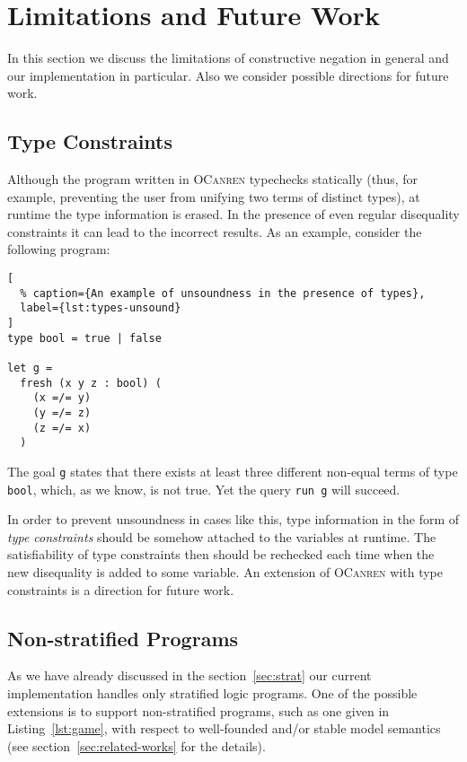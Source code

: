 \section{Limitations and Future Work}

\label{sec:limitations}

In this section we discuss the limitations 
of constructive negation in general 
and our implementation in particular. 
Also we consider possible directions for future work.

\subsection{Type Constraints}

Although the program written in \textsc{OCanren} typechecks statically 
(thus, for example, preventing the user from unifying two terms of distinct types),
at runtime the type information is erased.
In the presence of even regular disequality constraints
it can lead to the incorrect results.
As an example, consider the following program:

\begin{minipage}[h]{\textwidth}
\begin{lstlisting}[
  % caption={An example of unsoundness in the presence of types},
  label={lst:types-unsound}
]
type bool = true | false

let g = 
  fresh (x y z : bool) (
    (x =/= y)
    (y =/= z)
    (z =/= x)
  )
\end{lstlisting}
\end{minipage}

The goal \lstinline{g} states that there
exists at least three different non-equal 
terms of type \lstinline{bool},
which, as we know, is not true.
Yet the query \lstinline{run g} will succeed.

In order to prevent unsoundness in cases like this,
type information in the form of \emph{type constraints}
should be somehow attached to the variables at runtime.
The satisfiability of type constraints then should 
be rechecked each time when the new disequality is added to some variable.
An extension of \textsc{OCanren} with type constraints
is a direction for future work.

\subsection{Non-stratified Programs}

As we have already discussed in the section~\ref{sec:strat}
our current implementation handles only stratified logic programs.
One of the possible extensions is to support 
non-stratified programs, such as one given in Listing~\ref{lst:game},
with respect to well-founded and/or stable model semantics 
(see section~\ref{sec:related-works} for the details).


